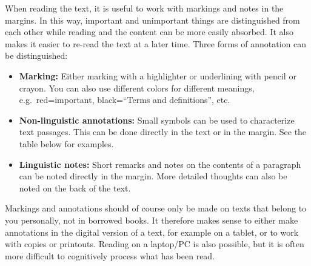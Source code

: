\documentclass[
  english,
]{scrreprt}
\begin{document}
When reading the text, it is useful to work with markings and notes in the margins. In this way, important and unimportant things are distinguished from each other while reading and the content can be more easily absorbed. It also makes it easier to re-read the text at a later time. Three forms of annotation can be distinguished:

\begin{itemize}
\item
  \textbf{Marking:} Either marking with a highlighter or underlining with pencil or crayon. You can also use different colors for different meanings, e.g.~red=important, black=“Terms and definitions”, etc.
\item
  \textbf{Non-linguistic annotations:} Small symbols can be used to characterize text passages. This can be done directly in the text or in the margin. See the table below for examples.
\item
  \textbf{Linguistic notes:} Short remarks and notes on the contents of a paragraph can be noted directly in the margin. More detailed thoughts can also be noted on the back of the text.
\end{itemize}

Markings and annotations should of course only be made on texts that belong to you personally, not in borrowed books. It therefore makes sense to either make annotations in the digital version of a text, for example on a tablet, or to work with copies or printouts. Reading on a laptop/PC is also possible, but it is often more difficult to cognitively process what has been read.
\end{document}
